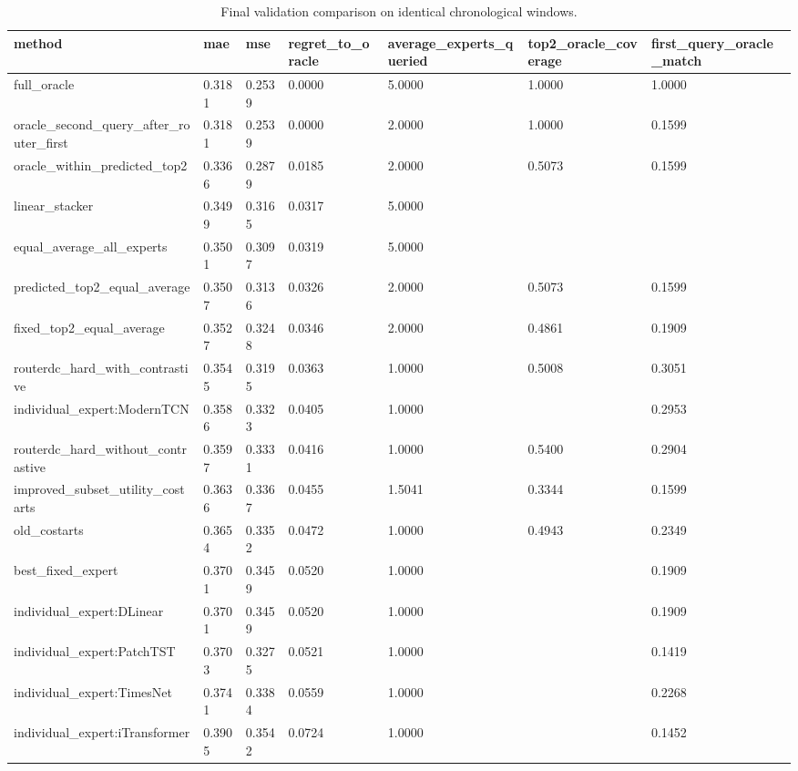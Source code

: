 \begin{table}
\caption{Final validation comparison on identical chronological windows.}
\label{tab:costarts-final-comparison}
\begin{tabular}{lllllll}
\toprule
method & mae & mse & regret\_to\_oracle & average\_experts\_queried & top2\_oracle\_coverage & first\_query\_oracle\_match \\
\midrule
full\_oracle & 0.3181 & 0.2539 & 0.0000 & 5.0000 & 1.0000 & 1.0000 \\
oracle\_second\_query\_after\_router\_first & 0.3181 & 0.2539 & 0.0000 & 2.0000 & 1.0000 & 0.1599 \\
oracle\_within\_predicted\_top2 & 0.3366 & 0.2879 & 0.0185 & 2.0000 & 0.5073 & 0.1599 \\
linear\_stacker & 0.3499 & 0.3165 & 0.0317 & 5.0000 &  &  \\
equal\_average\_all\_experts & 0.3501 & 0.3097 & 0.0319 & 5.0000 &  &  \\
predicted\_top2\_equal\_average & 0.3507 & 0.3136 & 0.0326 & 2.0000 & 0.5073 & 0.1599 \\
fixed\_top2\_equal\_average & 0.3527 & 0.3248 & 0.0346 & 2.0000 & 0.4861 & 0.1909 \\
routerdc\_hard\_with\_contrastive & 0.3545 & 0.3195 & 0.0363 & 1.0000 & 0.5008 & 0.3051 \\
individual\_expert:ModernTCN & 0.3586 & 0.3323 & 0.0405 & 1.0000 &  & 0.2953 \\
routerdc\_hard\_without\_contrastive & 0.3597 & 0.3331 & 0.0416 & 1.0000 & 0.5400 & 0.2904 \\
improved\_subset\_utility\_costarts & 0.3636 & 0.3367 & 0.0455 & 1.5041 & 0.3344 & 0.1599 \\
old\_costarts & 0.3654 & 0.3352 & 0.0472 & 1.0000 & 0.4943 & 0.2349 \\
best\_fixed\_expert & 0.3701 & 0.3459 & 0.0520 & 1.0000 &  & 0.1909 \\
individual\_expert:DLinear & 0.3701 & 0.3459 & 0.0520 & 1.0000 &  & 0.1909 \\
individual\_expert:PatchTST & 0.3703 & 0.3275 & 0.0521 & 1.0000 &  & 0.1419 \\
individual\_expert:TimesNet & 0.3741 & 0.3384 & 0.0559 & 1.0000 &  & 0.2268 \\
individual\_expert:iTransformer & 0.3905 & 0.3542 & 0.0724 & 1.0000 &  & 0.1452 \\
\bottomrule
\end{tabular}
\end{table}
